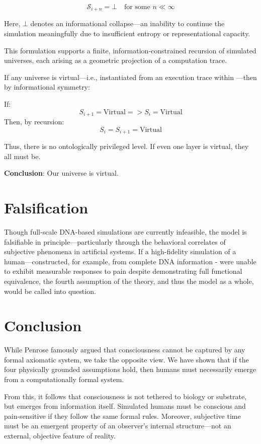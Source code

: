 \documentclass[11pt]{article}
\begin{document}
\[
  \mathcal{S}_{i+n} = \bot \quad \text{for some } n \ll \infty
\]

Here, \( \bot \) denotes an informational collapse—an inability to continue the simulation meaningfully due to insufficient
entropy or representational capacity.

This formulation supports a finite, information-constrained recursion of simulated universes, each arising as a geometric 
projection of a computation trace.

If any universe  is virtual—i.e., instantiated from an execution trace within —then by informational symmetry:

If:
\[
  S_{i+1} = \text{Virtual} => S_{i} = \text{Virtual}
\]
Then, by recursion:
\[
  S_i = S_{i+1} = \text{Virtual}
\]

Thus, there is no ontologically privileged level. If even one layer is virtual, they all must be.

\textbf{Conclusion}: Our universe is virtual.



\section{Falsification}

Though full-scale DNA-based simulations are currently infeasible, the model is falsifiable in principle—particularly 
through the behavioral correlates of subjective phenomena in artificial systems. If a high-fidelity simulation of a 
human—constructed, for example, from complete DNA information - were unable to exhibit measurable responses to pain 
despite demonstrating full functional equivalence, the fourth assumption of the theory, and thus the model as a whole, 
would be called into question.



\section{Conclusion}

While Penrose \cite{penrose1989emperor} famously argued that consciousness cannot be captured by any formal 
axiomatic system, we take the opposite view. We have shown that if the four physically grounded assumptions hold,
then humans must necessarily emerge from a computationally formal system.

From this, it follows that consciousness is not tethered to biology or substrate, but emerges from information itself. 
Simulated humans must be conscious and pain-sensitive if they follow the same formal rules. Moreover, subjective 
time must be an emergent property of an observer’s internal structure—not an external, objective feature of reality.
\end{document}
